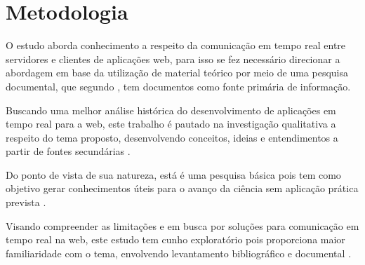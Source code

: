 \section{Metodologia}

O estudo aborda conhecimento a respeito da comunicação em tempo real entre servidores e clientes de aplicações web, para isso se fez necessário direcionar a abordagem em base da utilização de material teórico por meio de uma pesquisa documental, que segundo \cite{Marconi2003}, tem documentos como fonte primária de informação.

Buscando uma melhor análise histórica do desenvolvimento de aplicações em tempo real para a web, este trabalho é pautado na investigação qualitativa a respeito do tema proposto, desenvolvendo conceitos, ideias e entendimentos a partir de fontes secundárias \citep{prodanov2013metodologia}.

Do ponto de vista de sua natureza, está é uma pesquisa básica pois tem como objetivo gerar conhecimentos úteis para o avanço da ciência sem aplicação prática prevista \citep{prodanov2013metodologia}.

Visando compreender as limitações e em busca por soluções para comunicação em tempo real na web, este estudo tem cunho exploratório pois proporciona maior familiaridade com o tema, envolvendo levantamento bibliográfico e documental \citep{gil2002elaborar}.